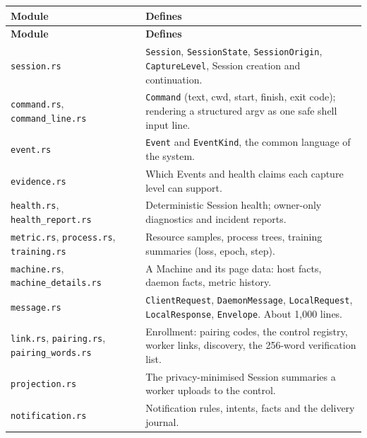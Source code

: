 \begin{small}
\begin{longtable}{>{\raggedright\arraybackslash}p{0.356\dimexpr \linewidth-4\tabcolsep\relax}>{\raggedright\arraybackslash}p{0.644\dimexpr \linewidth-4\tabcolsep\relax}}
\toprule
\textbf{Module} & \textbf{Defines} \\
\midrule
\endfirsthead
\toprule
\textbf{Module} & \textbf{Defines} \\
\midrule
\endhead
\texttt{session.\allowbreak{}rs} & \texttt{Session}, \texttt{SessionState}, \texttt{SessionOrigin}, \texttt{CaptureLevel}, Session creation and continuation. \\
\texttt{command.\allowbreak{}rs}, \texttt{command\_\allowbreak{}line.\allowbreak{}rs} & \texttt{Command} (text, cwd, start, finish, exit code); rendering a structured argv as one safe shell input line. \\
\texttt{event.\allowbreak{}rs} & \texttt{Event} and \texttt{EventKind}, the common language of the system. \\
\texttt{evidence.\allowbreak{}rs} & Which Events and health claims each capture level can support. \\
\texttt{health.\allowbreak{}rs}, \texttt{health\_\allowbreak{}report.\allowbreak{}rs} & Deterministic Session health; owner-only diagnostics and incident reports. \\
\texttt{metric.\allowbreak{}rs}, \texttt{process.\allowbreak{}rs}, \texttt{training.\allowbreak{}rs} & Resource samples, process trees, training summaries (loss, epoch, step). \\
\texttt{machine.\allowbreak{}rs}, \texttt{machine\_\allowbreak{}details.\allowbreak{}rs} & A Machine and its page data: host facts, daemon facts, metric history. \\
\texttt{message.\allowbreak{}rs} & \texttt{ClientRequest}, \texttt{DaemonMessage}, \texttt{LocalRequest}, \texttt{LocalResponse}, \texttt{Envelope}. About 1,000 lines. \\
\texttt{link.\allowbreak{}rs}, \texttt{pairing.\allowbreak{}rs}, \texttt{pairing\_\allowbreak{}words.\allowbreak{}rs} & Enrollment: pairing codes, the control registry, worker links, discovery, the 256-word verification list. \\
\texttt{projection.\allowbreak{}rs} & The privacy-minimised Session summaries a worker uploads to the control. \\
\texttt{notification.\allowbreak{}rs} & Notification rules, intents, facts and the delivery journal. \\

\end{longtable}
\end{small}
